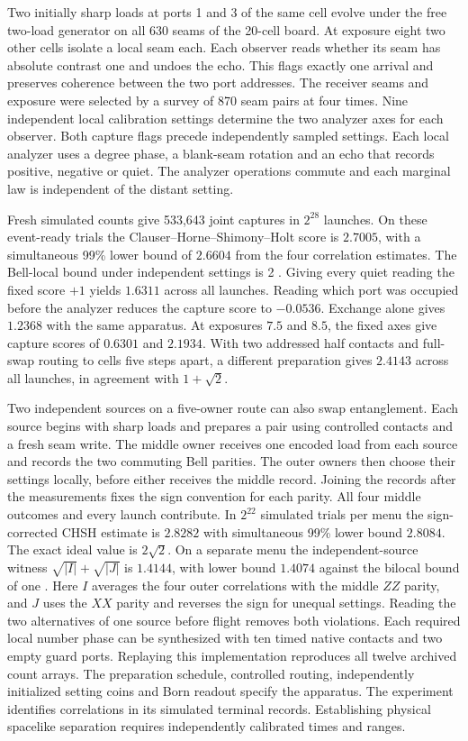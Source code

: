 \documentclass[11pt]{article}
\theoremstyle{definition}
\theoremstyle{remark}
\theoremstyle{plain}
\begin{document}
Two initially sharp loads at ports 1 and 3 of the same cell evolve
under the free two-load generator on all 630 seams of the 20-cell
board. At exposure eight two other cells isolate a local seam each.
Each observer reads whether its seam has absolute contrast one and
undoes the echo. This flags exactly one arrival and preserves coherence
between the two port addresses. The receiver seams and exposure were
selected by a survey of 870 seam pairs at four times. Nine independent
local calibration settings determine the two analyzer axes for each
observer. Both capture flags precede independently sampled settings.
Each local analyzer uses a degree phase, a blank-seam rotation and an
echo that records positive, negative or quiet. The analyzer operations
commute and each marginal law is independent of the distant setting.

Fresh simulated counts give 533,643 joint captures in $2^{28}$ launches.
On these event-ready trials the Clauser--Horne--Shimony--Holt score
is $2.7005$, with a simultaneous 99\% lower bound of $2.6604$ from
the four correlation estimates. The Bell-local bound under independent
settings is 2 \cite{chsh1969}. Giving every quiet reading the fixed score $+1$ yields
$1.6311$ across all launches. Reading which port was occupied before the
analyzer reduces the capture score to $-0.0536$. Exchange alone gives
$1.2368$ with the same apparatus. At exposures $7.5$ and $8.5$, the
fixed axes give capture scores of $0.6301$ and $2.1934$. With two
addressed half contacts and full-swap routing to cells five steps apart,
a different preparation gives $2.4143$ across all launches, in agreement
with $1+\sqrt2$.

Two independent sources on a five-owner route can also swap
entanglement. Each source begins with sharp loads and prepares a pair
using controlled contacts and a fresh seam write. The middle owner
receives one encoded load from each source and records the two
commuting Bell parities. The outer owners then choose their settings
locally, before either receives the middle record. Joining the records
after the measurements fixes the sign convention for each parity.
All four middle outcomes and every launch contribute. In $2^{22}$
simulated trials per menu the sign-corrected CHSH estimate is $2.8282$
with simultaneous 99\% lower bound $2.8084$. The exact ideal value is
$2\sqrt{2}$. On a separate menu the independent-source witness
$\sqrt{|I|}+\sqrt{|J|}$ is $1.4144$, with lower bound $1.4074$ against
the bilocal bound of one \cite{branciard2012}. Here $I$ averages the four outer correlations
with the middle $ZZ$ parity, and $J$ uses the $XX$ parity and reverses
the sign for unequal settings. Reading the two alternatives of one
source before flight removes both violations. Each required local number
phase can be synthesized with ten timed native contacts and two empty
guard ports. Replaying this implementation reproduces all twelve
archived count arrays. The preparation schedule,
controlled routing, independently initialized setting coins and Born
readout specify the apparatus. The experiment identifies correlations
in its simulated terminal records. Establishing physical spacelike
separation requires independently calibrated times and ranges.
\end{document}
